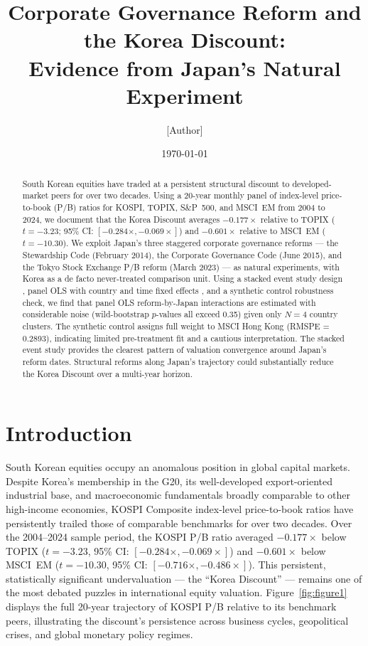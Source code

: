 \documentclass[12pt]{article}
\title{Corporate Governance Reform and the Korea Discount:\\
Evidence from Japan's Natural Experiment}
\author{[Author]}
\date{\today}
\begin{document}
\maketitle

\begin{abstract}
South Korean equities have traded at a persistent structural discount to developed-market peers
for over two decades. Using a 20-year monthly panel of index-level price-to-book (P/B) ratios
for KOSPI, TOPIX, S\&P~500, and MSCI~EM from 2004 to 2024, we document that the Korea Discount
averages $-0.177\times$ relative to TOPIX ($t=-3.23$; 95\% CI: $[-0.284\times, -0.069\times]$)
and $-0.601\times$ relative to MSCI~EM ($t=-10.30$). We exploit Japan's three staggered
corporate governance reforms --- the Stewardship Code (February 2014), the Corporate Governance
Code (June 2015), and the Tokyo Stock Exchange P/B reform (March 2023) --- as natural
experiments, with Korea as a de facto never-treated comparison unit. Using a stacked event
study design \citep{cengiz2019, baker2022}, panel OLS with country and time fixed effects
\citep{abadie2010}, and a synthetic control robustness check, we find that panel OLS
reform-by-Japan interactions are estimated with considerable noise (wild-bootstrap
$p$-values all exceed 0.35) given only $N=4$ country clusters. The synthetic control
assigns full weight to MSCI Hong Kong (RMSPE = 0.2893), indicating limited pre-treatment
fit and a cautious interpretation. The stacked event study provides the clearest pattern
of valuation convergence around Japan's reform dates. Structural reforms along Japan's
trajectory could substantially reduce the Korea Discount over a multi-year horizon.
\end{abstract}

\newpage
\tableofcontents
\newpage

\section{Introduction}
\label{sec:intro}

South Korean equities occupy an anomalous position in global capital markets. Despite Korea's
membership in the G20, its well-developed export-oriented industrial base, and macroeconomic
fundamentals broadly comparable to other high-income economies, KOSPI Composite index-level
price-to-book ratios have persistently trailed those of comparable benchmarks for over two
decades. Over the 2004--2024 sample period, the KOSPI P/B ratio averaged $-0.177\times$ below
TOPIX ($t=-3.23$, 95\% CI: $[-0.284\times, -0.069\times]$) and $-0.601\times$ below MSCI~EM
($t=-10.30$, 95\% CI: $[-0.716\times, -0.486\times]$). This persistent, statistically
significant undervaluation --- the ``Korea Discount'' --- remains one of the most debated
puzzles in international equity valuation. Figure~\ref{fig:figure1} displays the full
20-year trajectory of KOSPI P/B relative to its benchmark peers, illustrating the discount's
persistence across business cycles, geopolitical crises, and global monetary policy regimes.
\end{document}
